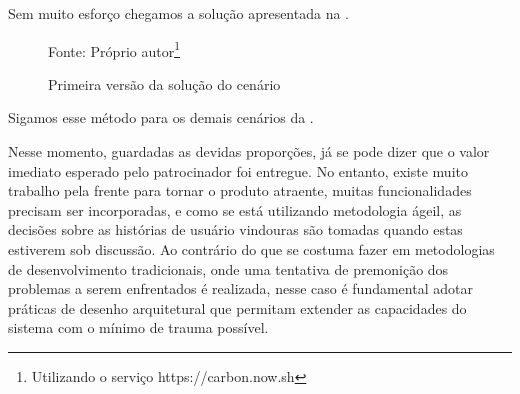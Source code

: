  Sem muito esforço chegamos a solução apresentada na .

  \begin{figure}[h]
    \centering
    \caption{Primeira versão da solução do cenário}
    Fonte: Próprio autor\footnote{Utilizando o serviço https://carbon.now.sh}
    \label{fig:primeira-solucao}
  \end{figure}

  Sigamos esse método para os demais cenários da .

  Nesse momento, guardadas as devidas proporções, já se pode dizer que o valor imediato esperado pelo patrocinador foi entregue. No entanto, existe muito trabalho pela frente para tornar o produto atraente, muitas funcionalidades precisam ser incorporadas, e como se está utilizando metodologia ágeil, as decisões sobre as histórias de usuário vindouras são tomadas quando estas estiverem sob discussão. Ao contrário do que se costuma fazer em metodologias de desenvolvimento tradicionais, onde uma tentativa de premonição dos problemas a serem enfrentados é realizada, nesse caso é fundamental adotar práticas de desenho arquitetural que permitam extender as capacidades do sistema com o mínimo de trauma possível.

